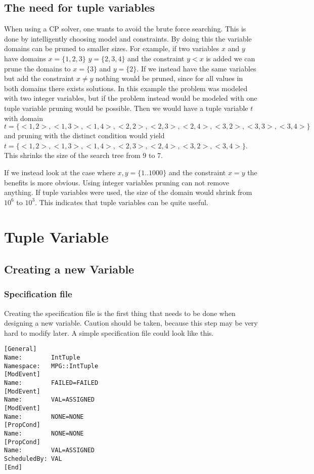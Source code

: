 \documentclass[a4paper,11pt]{article}
\begin{document}
\subsection{The need for tuple variables}
When using a CP solver, one wants to avoid the brute force searching. This is done by intelligently choosing model and constraints. By doing this the variable domains can be pruned to smaller sizes. For example, if two variables $x$ and $y$ have domains $x=\{1,2,3\}$ $y=\{2,3,4\}$ and the constraint $y<x$ is added we can prune the domains to $x=\{3\}$ and $y=\{2\}$. If we instead have the same variables but add the constraint $x\neq y$ nothing would be pruned, since for all values in both domains there exists solutions. In this example the problem was modeled with two integer variables, but if the problem instead would be modeled with one tuple variable pruning would be possible. Then we would have a tuple variable $t$ with domain $t=\{<1,2>,<1,3>,<1,4>,<2,2>,<2,3>,<2,4>,<3,2>,<3,3>,<3,4>\}$ and pruning with the distinct condition would yield $t=\{<1,2>,<1,3>,<1,4>,<2,3>,<2,4>,<3,2>,<3,4>\}$. This shrinks the size of the search tree from 9 to 7. 

If we instead look at the case where $x,y=\{1..1000\}$ and the constraint $x=y$ the benefits is more obvious. Using integer variables pruning can not remove anything. If tuple variables were used, the size of the domain would shrink from $10^6$ to $10^3$. This indicates that tuple variables can be quite useful.



\section{Tuple Variable}

\subsection{Creating a new Variable}
\subsubsection{Specification file}
Creating the specification file is the first thing that needs to be done when designing a new variable. Caution should be taken, because this step may be very hard to modify later. A simple specification file could look like this.

\begin{lstlisting}[frame=single]
[General]
Name:        IntTuple
Namespace:   MPG::IntTuple
[ModEvent]
Name:        FAILED=FAILED
[ModEvent]
Name:        VAL=ASSIGNED
[ModEvent]
Name:        NONE=NONE
[PropCond]
Name:        NONE=NONE
[PropCond]
Name:        VAL=ASSIGNED
ScheduledBy: VAL
[End]
\end{lstlisting}
\end{document}
